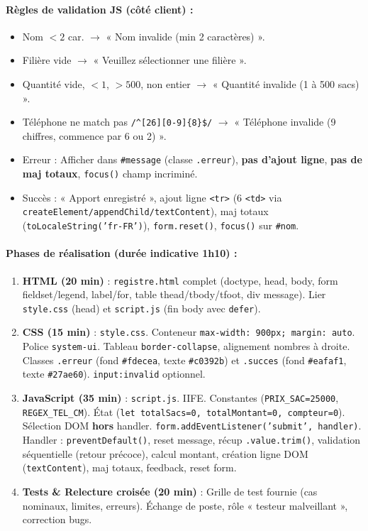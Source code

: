 \documentclass[11pt]{article}
\begin{document}
\begin{experience}
\paragraph{Règles de validation JS (côté client) :}
\begin{itemize}
    \item Nom $< 2$ car. $\rightarrow$ « Nom invalide (min 2 caractères) ».
    \item Filière vide $\rightarrow$ « Veuillez sélectionner une filière ».
    \item Quantité vide, $<1$, $>500$, non entier $\rightarrow$ « Quantité invalide (1 à 500 sacs) ».
    \item Téléphone ne match pas \verb|/^[26][0-9]{8}$/| $\rightarrow$ « Téléphone invalide (9 chiffres, commence par 6 ou 2) ».
    \item Erreur : Afficher dans \texttt{\#message} (classe \texttt{.erreur}), \textbf{pas d'ajout ligne}, \textbf{pas de maj totaux}, \texttt{focus()} champ incriminé.
    \item Succès : « Apport enregistré », ajout ligne \texttt{<tr>} (6 \texttt{<td>} via \texttt{createElement/appendChild/textContent}), maj totaux (\texttt{toLocaleString('fr-FR')}), \texttt{form.reset()}, \texttt{focus()} sur \texttt{\#nom}.
\end{itemize}

\paragraph{Phases de réalisation (durée indicative 1h10) :}
\begin{enumerate}
    \item \textbf{HTML (20 min)} : \texttt{registre.html} complet (doctype, head, body, form fieldset/legend, label/for, table thead/tbody/tfoot, div message). Lier \texttt{style.css} (head) et \texttt{script.js} (fin body avec \texttt{defer}).
    \item \textbf{CSS (15 min)} : \texttt{style.css}. Conteneur \texttt{max-width: 900px; margin: auto}. Police \texttt{system-ui}. Tableau \texttt{border-collapse}, alignement nombres à droite. Classes \texttt{.erreur} (fond \texttt{\#fdecea}, texte \texttt{\#c0392b}) et \texttt{.succes} (fond \texttt{\#eafaf1}, texte \texttt{\#27ae60}). \texttt{input:invalid} optionnel.
    \item \textbf{JavaScript (35 min)} : \texttt{script.js}. IIFE. Constantes (\texttt{PRIX\_SAC=25000}, \texttt{REGEX\_TEL\_CM}). État (\texttt{let totalSacs=0, totalMontant=0, compteur=0}). Sélection DOM \textbf{hors} handler. \texttt{form.addEventListener('submit', handler)}. Handler : \texttt{preventDefault()}, reset message, récup \texttt{.value.trim()}, validation séquentielle (retour précoce), calcul montant, création ligne DOM (\texttt{textContent}), maj totaux, feedback, reset form.
    \item \textbf{Tests \& Relecture croisée (20 min)} : Grille de test fournie (cas nominaux, limites, erreurs). Échange de poste, rôle « testeur malveillant », correction bugs.
\end{enumerate}


\end{experience}
\end{document}
